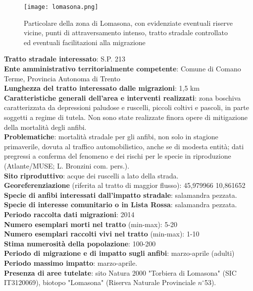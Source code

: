 \documentclass[11pt,a4paper,twoside]{memoir}
\begin{document}
\begin{figure}[H]
\label{fig:map_lomasona}
\centering
  \texttt{[image: lomasona.png]}
\caption{Particolare della zona di Lomasona, con evidenziate eventuali riserve vicine, punti di attraversamento intenso, tratto stradale controllato ed eventuali facilitazioni alla migrazione}
\end{figure}

\textbf{Tratto stradale interessato}: S.P. 213 \\
\textbf{Ente amministrativo territorialmente competente}: Comune di Comano Terme, Provincia Autonoma di Trento \\ 
\textbf{Lunghezza del tratto interessato dalle migrazioni}: 1,5 km \\
\textbf{Caratteristiche generali dell’area e interventi realizzati}: zona boschiva caratterizzata da depressioni paludose e ruscelli, piccoli coltivi e pascoli, in parte soggetti a regime di tutela. Non sono state realizzate finora opere di mitigazione della mortalità degli anfibi. \\
\textbf{Problematiche}: mortalità stradale per gli anfibi, non solo in stagione primaverile, dovuta al traffico automobilistico, anche se di modesta entità; dati pregressi a conferma del fenomeno e dei rischi per le specie in riproduzione (Atlante/MUSE; L. Bronzini com. pers.). \\
\textbf{Sito riproduttivo}: acque dei ruscelli a lato della strada. \\
\textbf{Georeferenziazione} (riferita al tratto di maggior flusso): 45,979966 10,861652 \\
\textbf{Specie di anfibi interessati dall’impatto stradale}: salamandra pezzata. \\
\textbf{Specie di interesse comunitario o in Lista Rossa}: salamandra pezzata. \\
\textbf{Periodo raccolta dati migrazioni}: 2014 \\ 
\textbf{Numero esemplari morti nel tratto} (min-max): 5-20  \\
\textbf{Numero esemplari raccolti vivi nel tratto} (min-max): 1-10  \\
\textbf{Stima numerosità della popolazione}: 100-200 \\
\textbf{Periodo di migrazione e di impatto sugli anfibi}: marzo-aprile (adulti) \\
\textbf{Periodo massimo impatto}: marzo-aprile. \\
\textbf{Presenza di aree tutelate}: sito Natura 2000 "Torbiera di Lomasona" (SIC IT3120069), biotopo "Lomasona" (Riserva Naturale Provinciale $n^{\circ}$53). \\
\end{document}
